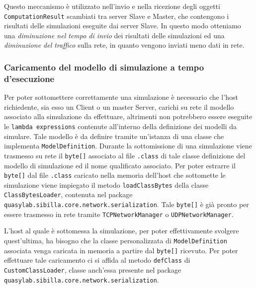 Questo meccanismo è utilizzato nell'invio e nella ricezione degli oggetti \texttt{ComputationResult} scambiati tra server Slave e Master, che contengono i risultati delle simulazioni eseguite dai server Slave. In questo modo otteniamo una \emph{diminuzione nel tempo di invio} dei risultati delle simulazioni ed una \emph{diminuzione del traffico} sulla rete, in quanto vengono inviati meno dati in rete.

\subsubsection{Caricamento del modello di simulazione a tempo d'esecuzione}
Per poter sottomettere correttamente una simulazione è necessario che l'host richiedente, sia esso un Client o un master Server, carichi su rete il modello associato alla simulazione da effettuare, altrimenti non potrebbero essere eseguite le \texttt{lambda expressions} contenute all'interno della definizione dei modelli da simulare. Tale modello è da definire tramite un'istanza di una classe che implementa \texttt{ModelDefinition}.
Durante la sottomissione di una simulazione viene trasmesso su rete il \texttt{byte[]} associato al file \texttt{.class} di tale classe definizione del modello di simulazione ed il nome qualificato associato. Per poter estrarre il \texttt{byte[]} dal file \texttt{.class} caricato nella memoria dell'host che sottomette le simulazione viene impiegato il metodo \texttt{loadClassBytes} della classe \texttt{ClassBytesLoader}, contenuta nel package \texttt{quasylab.sibilla.core.network.serialization}. Tale \texttt{byte[]} è già pronto per essere trasmesso in rete tramite \texttt{TCPNetworkManager} o \texttt{UDPNetworkManager}.

L'host al quale è sottomessa la simulazione, per poter effettivamente svolgere quest'ultima, ha bisogno che la classe personalizzata di \texttt{ModelDefinition} associata venga caricata in memoria a partire dal \texttt{byte[]} ricevuto. Per poter effettuare tale caricamento ci si affida al metodo \texttt{defClass} di \texttt{CustomClassLoader}, classe anch'essa presente nel package \texttt{quasylab.sibilla.core.network.serialization}. 

